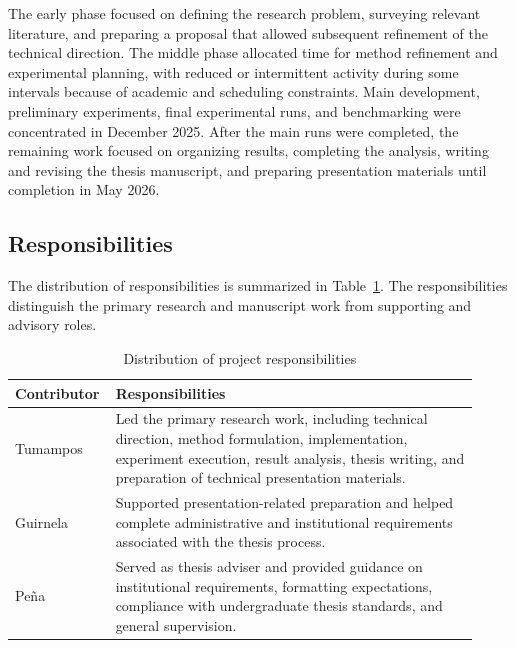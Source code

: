 The early phase focused on defining the research problem, surveying relevant literature, and preparing a proposal that allowed subsequent refinement of the technical direction.
The middle phase allocated time for method refinement and experimental planning, with reduced or intermittent activity during some intervals because of academic and scheduling constraints.
Main development, preliminary experiments, final experimental runs, and benchmarking were concentrated in December 2025.
After the main runs were completed, the remaining work focused on organizing results, completing the analysis, writing and revising the thesis manuscript, and preparing presentation materials until completion in May 2026.

\subsection{Responsibilities}
\label{subsec:methodology_responsibilities}

The distribution of responsibilities is summarized in Table~\ref{tab:project_management_responsibilities}.
The responsibilities distinguish the primary research and manuscript work from supporting and advisory roles.

\begin{table}[htbp]
\centering
\caption{Distribution of project responsibilities}
\label{tab:project_management_responsibilities}
\begin{tabular}{@{}p{0.16\linewidth}p{0.76\linewidth}@{}}
\toprule
Contributor & Responsibilities \\
\midrule
Tumampos & Led the primary research work, including technical direction, method formulation, implementation, experiment execution, result analysis, thesis writing, and preparation of technical presentation materials. \\
Guirnela & Supported presentation-related preparation and helped complete administrative and institutional requirements associated with the thesis process. \\
Peña & Served as thesis adviser and provided guidance on institutional requirements, formatting expectations, compliance with undergraduate thesis standards, and general supervision. \\
\bottomrule
\end{tabular}
\end{table}